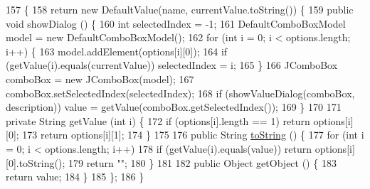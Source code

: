 \begin{DoxyCode}
157                                                                                                            
                            \{
158         \textcolor{keywordflow}{return} \textcolor{keyword}{new} DefaultValue(name, currentValue.toString()) \{
159             \textcolor{keyword}{public} \textcolor{keywordtype}{void} showDialog () \{
160                 \textcolor{keywordtype}{int} selectedIndex = -1;
161                 DefaultComboBoxModel model = \textcolor{keyword}{new} DefaultComboBoxModel();
162                 \textcolor{keywordflow}{for} (\textcolor{keywordtype}{int} i = 0; i < options.length; i++) \{
163                     model.addElement(options[i][0]);
164                     \textcolor{keywordflow}{if} (getValue(i).equals(currentValue)) selectedIndex = i;
165                 \}
166                 JComboBox comboBox = \textcolor{keyword}{new} JComboBox(model);
167                 comboBox.setSelectedIndex(selectedIndex);
168                 \textcolor{keywordflow}{if} (showValueDialog(comboBox, description)) value = getValue(comboBox.getSelectedIndex());
169             \}
170 
171             \textcolor{keyword}{private} String getValue (\textcolor{keywordtype}{int} i) \{
172                 \textcolor{keywordflow}{if} (options[i].length == 1) \textcolor{keywordflow}{return} options[i][0];
173                 \textcolor{keywordflow}{return} options[i][1];
174             \}
175 
176             \textcolor{keyword}{public} String \mbox{\hyperlink{classorg_1_1newdawn_1_1slick_1_1font_1_1effects_1_1_effect_util_a1848c80a85521b5ddf5e1e360ec9fc89}{toString}} () \{
177                 \textcolor{keywordflow}{for} (\textcolor{keywordtype}{int} i = 0; i < options.length; i++)
178                     \textcolor{keywordflow}{if} (getValue(i).equals(value)) \textcolor{keywordflow}{return} options[i][0].toString();
179                 \textcolor{keywordflow}{return} \textcolor{stringliteral}{""};
180             \}
181 
182             \textcolor{keyword}{public} Object getObject () \{
183                 \textcolor{keywordflow}{return} value;
184             \}
185         \};
186     \}
\end{DoxyCode}
\mbox{\label{classorg_1_1newdawn_1_1slick_1_1font_1_1effects_1_1_effect_util_a1848c80a85521b5ddf5e1e360ec9fc89}} 
